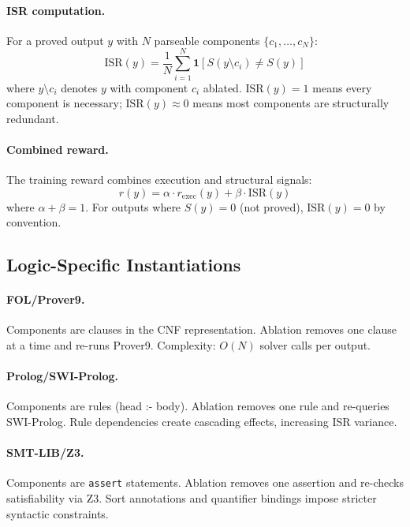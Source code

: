 \documentclass[11pt,a4paper]{article}
\begin{document}
\paragraph{ISR computation.}
For a proved output $y$ with $N$ parseable components $\{c_1, \ldots, c_N\}$:
\begin{equation}
  \text{ISR}(y) = \frac{1}{N} \sum_{i=1}^{N} \mathbf{1}[S(y \setminus c_i) \neq S(y)]
\end{equation}
where $y \setminus c_i$ denotes $y$ with component $c_i$ ablated.
$\text{ISR}(y) = 1$ means every component is necessary; $\text{ISR}(y) \approx 0$ means most components are structurally redundant.

\paragraph{Combined reward.}
The training reward combines execution and structural signals:
\begin{equation}
  r(y) = \alpha \cdot r_{\text{exec}}(y) + \beta \cdot \text{ISR}(y)
\end{equation}
where $\alpha + \beta = 1$.
For outputs where $S(y) = 0$ (not proved), $\text{ISR}(y) = 0$ by convention.

\subsection{Logic-Specific Instantiations}

\paragraph{FOL/Prover9.}
Components are clauses in the CNF representation.
Ablation removes one clause at a time and re-runs Prover9.
Complexity: $O(N)$ solver calls per output.

\paragraph{Prolog/SWI-Prolog.}
Components are rules (head :- body).
Ablation removes one rule and re-queries SWI-Prolog.
Rule dependencies create cascading effects, increasing ISR variance.

\paragraph{SMT-LIB/Z3.}
Components are \texttt{assert} statements.
Ablation removes one assertion and re-checks satisfiability via Z3.
Sort annotations and quantifier bindings impose stricter syntactic constraints.
\end{document}
